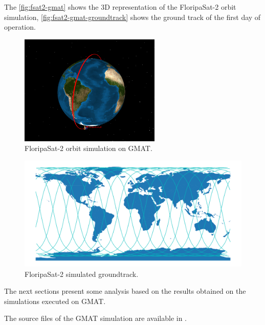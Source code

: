 The \autoref{fig:fsat2-gmat} shows the 3D representation of the FloripaSat-2 orbit simulation, \autoref{fig:fsat2-gmat-groundtrack} shows the ground track of the first day of operation.

\begin{figure}[!ht]
    \begin{center}
        \includegraphics[width=0.6\textwidth]{figures/fsat2-gmat.png}
        \caption{FloripaSat-2 orbit simulation on GMAT.}
        \label{fig:fsat2-gmat}
    \end{center}
\end{figure}

\begin{figure}[!ht]
    \begin{center}
        \includegraphics[width=\textwidth]{figures/fsat2-gmat-groundtrack.pdf}
        \caption{FloripaSat-2 simulated groundtrack.}
        \label{fig:fsat2-gmat-groundtrack}
    \end{center}
\end{figure}

The next sections present some analysis based on the results obtained on the simulations executed on GMAT.

The source files of the GMAT simulation are available in \cite{fsat2-mechanical}.

